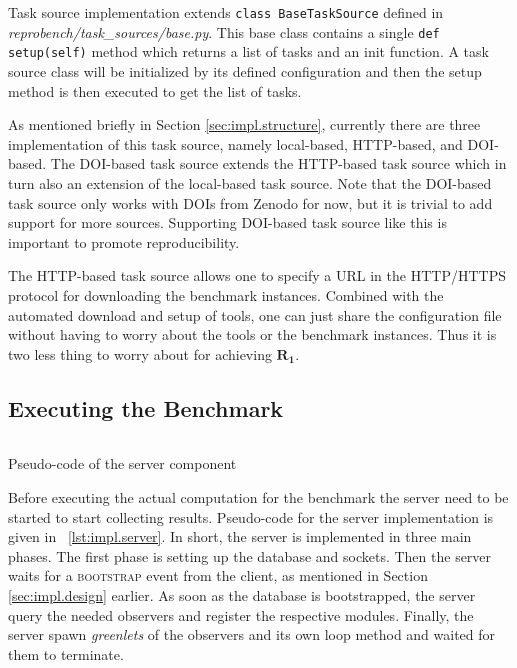 Task source implementation extends \texttt{class BaseTaskSource} defined in \emph{reprobench/task\_sources/base.py}.
This base class contains a single \texttt{def setup(self)} method which returns a list of tasks and an init function.
A task source class will be initialized by its defined configuration and then the setup method is then executed to get the list of tasks.

As mentioned briefly in Section \ref{sec:impl.structure}, currently there are three implementation of this task source, namely local-based, HTTP-based, and DOI-based.
The DOI-based task source extends the HTTP-based task source which in turn also an extension of the local-based task source.
Note that the DOI-based task source only works with DOIs from Zenodo \citep{nielsen_lars_holm_2017_802100} for now, but it is trivial to add support for more sources.
Supporting DOI-based task source like this is important to promote reproducibility.

The HTTP-based task source allows one to specify a URL in the HTTP/HTTPS protocol for downloading the benchmark instances.
Combined with the automated download and setup of tools, one can just share the configuration file without having to worry about the tools or the benchmark instances.
Thus it is two less thing to worry about for achieving \(\bm{R_1}\).


\subsection{Executing the Benchmark}

\begin{listing}
    \inputminted{python}{assets/listings/pseudocodes/server.py}
    \caption{Pseudo-code of the server component}
    \label{lst:impl.server}
\end{listing}

Before executing the actual computation for the benchmark the server need to be started to start collecting results.
Pseudo-code for the server implementation is given in \lst~\ref{lst:impl.server}.
In short, the server is implemented in three main phases.
The first phase is setting up the database and sockets.
Then the server waits for a \textsc{bootstrap} event from the client, as mentioned in Section \ref{sec:impl.design} earlier.
As soon as the database is bootstrapped, the server query the needed observers and register the respective modules.
Finally, the server spawn \emph{greenlets} of the observers and its own loop method and waited for them to terminate.

